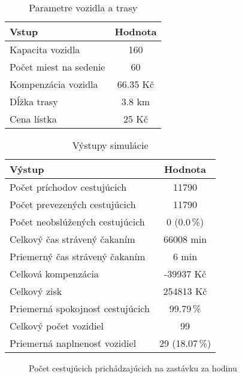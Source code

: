 \begin{table}[h]
  \centering
  \begin{tabular}{|l|c|}
    \hline
    \textbf{Vstup} & \textbf{Hodnota} \\ \hline
    Kapacita vozidla & 160 \\ \hline
    Počet miest na sedenie & 60 \\ \hline
    Kompenzácia vozidla & 66.35 Kč \\ \hline
    Dĺžka trasy & 3.8 km \\ \hline
    Cena lístka & 25 Kč \\ \hline
  \end{tabular}
  \caption{Parametre vozidla a trasy}
\end{table}

\begin{table}[h]
  \centering
  \begin{tabular}{|l|c|}
    \hline
    \textbf{Výstup} & \textbf{Hodnota} \\ \hline
    Počet príchodov cestujúcich & 11790 \\ \hline
    Počet prevezených cestujúcich & 11790 \\ \hline
    Počet neobslúžených cestujúcich & 0 (0.0\,\%) \\ \hline
    Celkový čas strávený čakaním & 66008 min \\ \hline
    Priemerný čas strávený čakaním & 6 min \\ \hline
    Celková kompenzácia & -39937 Kč \\ \hline
    Celkový zisk & 254813 Kč \\ \hline
    Priemerná spokojnosť cestujúcich & 99.79\,\% \\ \hline
    Celkový počet vozidiel & 99 \\ \hline
    Priemerná naplnenosť vozidiel & 29 (18.07\,\%) \\ \hline
  \end{tabular}
  \caption{Výstupy simulácie}
\end{table}

\begin{figure}[h]
  \centering
  \caption{Počet cestujúcich prichádzajúcich na zastávku za hodinu}
\end{figure}

